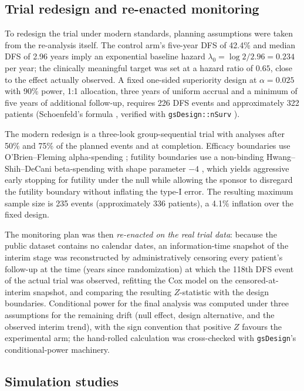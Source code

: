 \subsection{Trial redesign and re-enacted monitoring}
\label{sec:methods-design}

To redesign the trial under modern standards, planning assumptions were
taken from the re-analysis itself. The control arm's five-year DFS of
42.4\% and median DFS of 2.96 years imply an exponential baseline hazard
$\lambda_0 = \log 2 / 2.96 = 0.234$ per year; the clinically meaningful
target was set at a hazard ratio of $0.65$, close to the effect actually
observed. A fixed one-sided superiority design at $\alpha = 0.025$ with
90\% power, 1:1 allocation, three years of uniform accrual and a minimum
of five years of additional follow-up, requires 226 DFS events and
approximately 322 patients (Schoenfeld's formula
\citep{schoenfeld1983}, verified with \texttt{gsDesign::nSurv}
\citep{gsdesign2026}).

The modern redesign is a three-look group-sequential trial with analyses
after 50\% and 75\% of the planned events and at completion. Efficacy
boundaries use O'Brien--Fleming alpha-spending
\citep{o1979,landemets1983}; futility boundaries use a non-binding
Hwang--Shih--DeCani beta-spending with shape parameter $-4$
\citep{hwang1990}, which yields aggressive early stopping for futility
under the null while allowing the sponsor to disregard the futility
boundary without inflating the type-I error. The resulting maximum
sample size is 235 events (approximately 336 patients), a 4.1\%
inflation over the fixed design.

The monitoring plan was then \emph{re-enacted on the real trial data}:
because the public dataset contains no calendar dates, an
information-time snapshot of the interim stage was reconstructed by
administratively censoring every patient's follow-up at the time (years
since randomization) at which the 118th DFS event of the actual trial
was observed, refitting the Cox model on the censored-at-interim
snapshot, and comparing the resulting $Z$-statistic with the design
boundaries. Conditional power for the final analysis was computed under
three assumptions for the remaining drift (null effect, design
alternative, and the observed interim trend), with the sign convention
that positive $Z$ favours the experimental arm; the hand-rolled
calculation was cross-checked with \texttt{gsDesign}'s conditional-power
machinery.

\subsection{Simulation studies}\label{sec:methods-sim}

